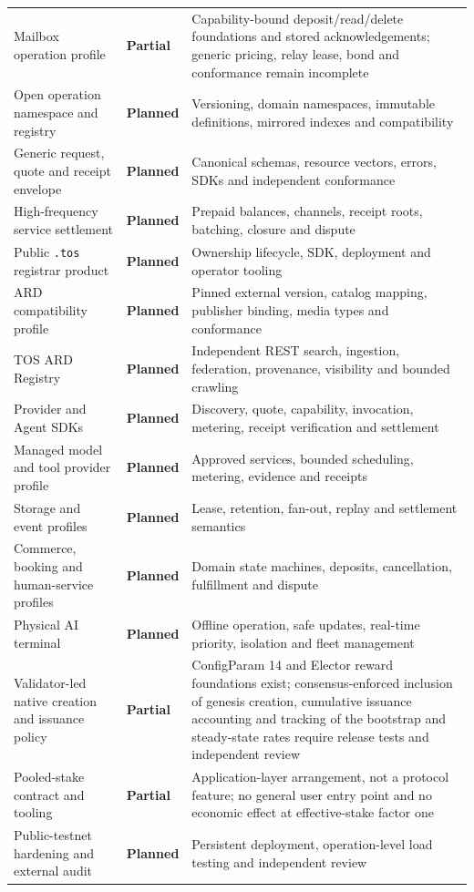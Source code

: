\documentclass[11pt,oneside]{article}
\newcommand{\planned}{\textbf{Planned}}
\newcommand{\partialstatus}{\textbf{Partial}}
\begin{document}
\begin{longtable}{L{0.34\textwidth}L{0.17\textwidth}L{0.38\textwidth}}
Mailbox operation profile &
\partialstatus &
Capability-bound deposit/read/delete foundations and stored acknowledgements; generic
pricing, relay lease, bond and conformance remain incomplete \\
Open operation namespace and registry &
\planned &
Versioning, domain namespaces, immutable definitions, mirrored indexes and compatibility \\
Generic request, quote and receipt envelope &
\planned &
Canonical schemas, resource vectors, errors, SDKs and independent conformance \\
High-frequency service settlement &
\planned &
Prepaid balances, channels, receipt roots, batching, closure and dispute \\
Public \texttt{.tos} registrar product &
\planned &
Ownership lifecycle, SDK, deployment and operator tooling \\
ARD compatibility profile &
\planned &
Pinned external version, catalog mapping, publisher binding, media types and conformance \\
TOS ARD Registry &
\planned &
Independent REST search, ingestion, federation, provenance, visibility and bounded crawling \\
Provider and Agent SDKs &
\planned &
Discovery, quote, capability, invocation, metering, receipt verification and settlement \\
Managed model and tool provider profile &
\planned &
Approved services, bounded scheduling, metering, evidence and receipts \\
Storage and event profiles &
\planned &
Lease, retention, fan-out, replay and settlement semantics \\
Commerce, booking and human-service profiles &
\planned &
Domain state machines, deposits, cancellation, fulfillment and dispute \\
Physical AI terminal &
\planned &
Offline operation, safe updates, real-time priority, isolation and fleet management \\
Validator-led native creation and issuance policy &
\partialstatus &
ConfigParam 14 and Elector reward foundations exist; consensus-enforced inclusion of genesis
creation, cumulative issuance accounting and tracking of the bootstrap and steady-state rates
require release tests and independent review \\
Pooled-stake contract and tooling &
\partialstatus &
Application-layer arrangement, not a protocol feature; no general user entry point and no
economic effect at effective-stake factor one \\
Public-testnet hardening and external audit &
\planned &
Persistent deployment, operation-level load testing and independent review \\
\bottomrule
\end{longtable}
\end{document}

